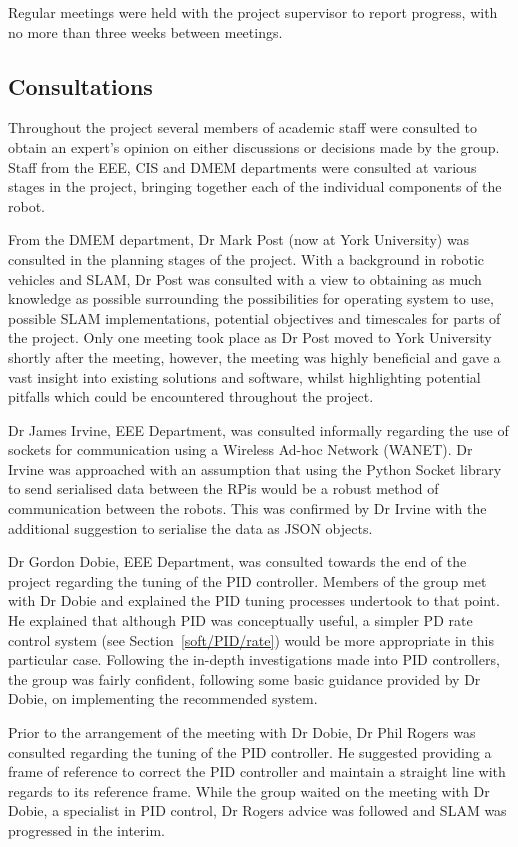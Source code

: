 Regular meetings were held with the project supervisor to report progress, with no
more than three weeks between meetings.

\subsection{Consultations}\label{pm/consultations}
Throughout the project several members of academic staff
were consulted to obtain an expert's opinion on either
discussions or decisions made by the group.
Staff from the EEE, CIS and DMEM departments were
consulted at various stages in the project, bringing together
each of the individual components of the robot.

From the DMEM department, Dr Mark Post (now at York University)
was consulted in the planning stages of the project. With a
background in robotic vehicles and SLAM, Dr Post was consulted
with a view to obtaining as much knowledge as possible
surrounding the possibilities for operating system to use,
possible SLAM implementations, potential objectives and
timescales for parts of the project. Only one meeting took place
as Dr Post moved to York University shortly after the meeting,
however, the meeting was highly beneficial and gave a vast
insight into existing solutions and software, whilst highlighting
potential pitfalls which could be encountered throughout
the project.

Dr James Irvine, EEE Department, was consulted informally
regarding the use of sockets for communication using a Wireless
Ad-hoc Network (WANET). Dr Irvine was approached with an
assumption that using the Python Socket library to send
serialised data between the RPis would be a robust
method of communication between the robots. This was confirmed
by Dr Irvine with the additional suggestion to serialise the data
as JSON objects.


Dr Gordon Dobie, EEE Department, was consulted towards the end
of the project regarding the tuning of the PID controller.
Members of the group met with Dr Dobie and explained the PID tuning
processes undertook to that point. He explained that although
PID was conceptually useful, a simpler PD rate control system (see Section~\ref{soft/PID/rate}) would be more appropriate
in this particular case. Following the in-depth investigations made
into PID controllers, the group was fairly confident, following some
basic guidance provided by Dr Dobie, on implementing the
recommended system.

Prior to the arrangement of the meeting with Dr Dobie, Dr Phil
Rogers was consulted regarding the tuning of the PID controller.
He suggested providing a frame of reference to correct
the PID controller and maintain a straight line with regards to
its reference frame. While the group waited on the meeting with
Dr Dobie, a specialist in PID control, Dr Rogers advice was
followed and SLAM was progressed in the interim.

